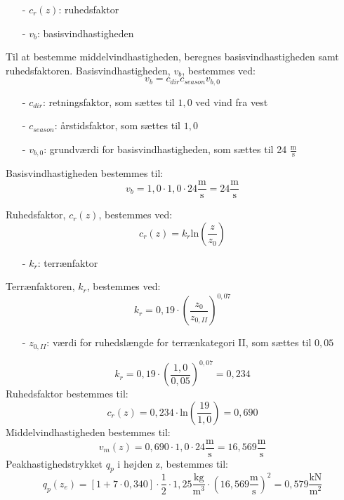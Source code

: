 \begin{itemize}
	\item[-] $c_r(z)$: ruhedsfaktor
	\item[-] $v_b$: basisvindhastigheden
\end{itemize}
Til at bestemme middelvindhastigheden, beregnes basisvindhastigheden samt ruhedsfaktoren.
\newline
\newline
Basisvindhastigheden, $v_b$, bestemmes ved:
\begin{equation}
	v_b=c_{dir}c_{season}v_{b,0}
\end{equation}
\begin{itemize}
	\item[-] $c_{dir}$: retningsfaktor, som sættes til $1,\!0$ ved vind fra vest \citep[ tabel 1a kapitel 4.2]{EU91}
	\item[-] $c_{season}$: årstidsfaktor, som sættes til $1,\!0$ \citep[ tabel 1b kapitel 4.2]{EU91}
	\item[-] $v_{b,0}$: grundværdi for basisvindhastigheden, som sættes til 24 $\frac{\text{m}}{\text{s}}$ \citep[ kapitel 4.2]{EU91}
\end{itemize}
Basisvindhastigheden bestemmes til:
\begin{equation}
	v_b=1,\!0\cdot 1,\!0\cdot 24 \frac{\text{m}}{\text{s}}=24 \frac{\text{m}}{\text{s}}
\end{equation}

Ruhedsfaktor, $c_r(z)$, bestemmes ved:
\begin{equation}
	c_r(z)=k_r \text{ln}(\frac{z}{z_0})
\end{equation}
\begin{itemize}
	\item[-] $k_r$: terrænfaktor
\end{itemize}

Terrænfaktoren, $k_r$, bestemmes ved:
\begin{equation}
	k_r=0,\!19\cdot (\frac{z_0}{z_{0,II}})^{0,07}
\end{equation}

\begin{itemize}
	\item[-] $z_{0,II}$: værdi for ruhedslængde for terrænkategori II, som sættes til $0,\!05$ \citep[ kapitel 4.3.2]{EU91}
\end{itemize}

\begin{equation}
	k_r=0,\!19\cdot (\frac{1,\!0}{0,\!05})^{0,07}=0,\!234
\end{equation}
Ruhedsfaktor bestemmes til:
\begin{equation}
	c_r(z)=0,\!234\cdot \text{ln}(\frac{19}{1,\!0})=0,\!690
\end{equation}
Middelvindhastigheden bestemmes til:
\begin{equation}
	v_m(z)=0,\!690\cdot 1,\!0\cdot 24 \frac{\text{m}}{\text{s}}=16,\!569 \frac{\text{m}}{\text{s}}
\end{equation}
Peakhastighedstrykket $q_p$ i højden z, bestemmes til:
\begin{equation}
	q_p(z_e)=[1+7\cdot 0,\!340]\cdot \frac{1}{2}\cdot 1,\!25 \frac{\text{kg}}{\text{m}^3}\cdot (16,\!569 \frac{\text{m}}{\text{s}})^2=0,\!579 \frac{\text{kN}}{\text{m}^2}
\end{equation}